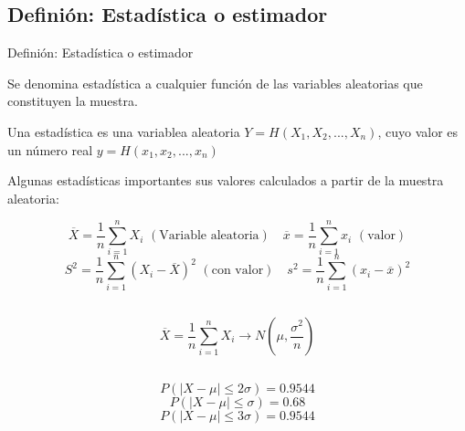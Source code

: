 \documentclass[
  ignorenonframetext,
]{beamer}
\begin{document}
\hypertarget{definiuxf3n-estaduxedstica-o-estimador}{%
\subsection{Definión: Estadística o
estimador}\label{definiuxf3n-estaduxedstica-o-estimador}}

\begin{frame}{Definión: Estadística o estimador}

Se denomina estadística a cualquier función de las variables aleatorias
que constituyen la muestra.

\justifying Una estadística es una variablea aleatoria
\(Y=H(X_1,X_2,...,X_n)\), cuyo valor es un número real
\(y=H(x_1,x_2,...,x_n)\)

Algunas estadísticas importantes sus valores calculados a partir de la
muestra aleatoria:

\[\overline{X}=\frac{1}{n} \sum_{i=1}^{n}X_i\,\,(\mbox{Variable aleatoria})\quad  \overline{x}=\frac{1}{n} \sum_{i=1}^{n}x_i\,\,(\mbox{valor})\]
\[S^2=\frac{1}{n} \sum_{i=1}^{n}(X_i-\overline{X})^2\,\,(\mbox{con valor})\quad  s^2=\frac{1}{n} \sum_{i=1}^{n}(x_i-\overline{x})^2\]

\end{frame}

\hypertarget{section-8}{%
\subsection{}\label{section-8}}

\begin{frame}{}

\[\overline{X}=\frac{1}{n} \sum_{i=1}^{n}X_i \longrightarrow N(\mu, \displaystyle \frac{\sigma^2}{n} ) \]

\end{frame}

\hypertarget{section-9}{%
\subsection{}\label{section-9}}

\begin{frame}{}

\[P(|X-\mu|\leq 2\sigma)=0.9544\] \[P(|X-\mu|\leq \sigma)=0.68\]
\[P(|X-\mu|\leq 3\sigma)=0.9544\]

\end{frame}
\end{document}
